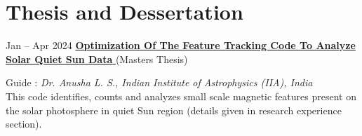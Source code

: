 \section{Thesis and Dessertation}

        \begin{twocolentry}{
            Jan – Apr 2024
        }
            \href{https://drive.google.com/file/d/1XAY01jkwndByMHBNCZhTZ_OLq4SwbaKe/view?usp=sharing}{\textbf{Optimization Of The Feature Tracking Code To Analyze Solar Quiet Sun Data }} (Masters Thesis)   \href{https://drive.google.com/file/d/177hjcXcHCzlMHXnNjdPv3_OTtgu7IE0A/view?usp=sharing}{\faExternalLink}
            \end{twocolentry}

        \vspace{0.10 cm}
        \begin{onecolentry}
        Guide : \textit{Dr. Anusha L. S., Indian Institute of Astrophysics (IIA), India}\\
            This code identifies, counts and analyzes small scale magnetic features present on the solar photosphere in quiet Sun region (details given in research experience section).
        \end{onecolentry}


        \vspace{0.2 cm}

        